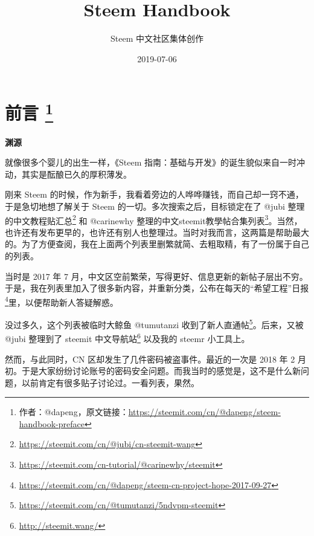 \documentclass[]{ctexbook}
\title{Steem Handbook}
\author{Steem 中文社区集体创作}
\date{2019-07-06}
\renewcommand{\href}[2]{#2\footnote{\url{#1}}}
\begin{document}

\begin{titlepage}

\end{titlepage}

\setlength{\abovedisplayskip}{-5pt}
\setlength{\abovedisplayshortskip}{-5pt}

{
\setcounter{tocdepth}{1}
\tableofcontents
}


\hypertarget{index}{%
\chapter*{\texorpdfstring{前言 \footnote{作者：@dapeng，原文链接：\url{https://steemit.com/cn/@dapeng/steem-handbook-preface}}}{前言 }}\label{index}}

\textbf{渊源}

就像很多个婴儿的出生一样，《Steem 指南：基础与开发》的诞生貌似来自一时冲动，其实是酝酿已久的厚积薄发。

刚来 Steem 的时候，作为新手，我看着旁边的人哗哗赚钱，而自己却一窍不通，于是急切地想了解关于 Steem 的一切。多次搜索之后，目标锁定在了 @jubi 整理的\href{https://steemit.com/cn/@jubi/cn-steemit-wang}{中文教程贴汇总} 和 @carinewhy 整理的\href{https://steemit.com/cn-tutorial/@carinewhy/steemit}{中文steemit教學帖合集列表}。当然，也许还有发布更早的，也许还有别人也整理过。当时对我而言，这两篇是帮助最大的。为了方便查阅，我在上面两个列表里删繁就简、去粗取精，有了一份属于自己的列表。

当时是 2017 年 7 月，中文区空前繁荣，写得更好、信息更新的新帖子层出不穷。于是，我在列表里加入了很多新内容，并重新分类，公布在每天的\href{https://steemit.com/cn/@dapeng/steem-cn-project-hope-2017-09-27}{``希望工程''日报}里，以便帮助新人答疑解惑。

没过多久，这个列表被临时大鲸鱼 @tumutanzi 收到了\href{https://steemit.com/cn/@tumutanzi/5ndvpm-steemit}{新人直通帖}。后来，又被 @jubi 整理到了 \href{http://steemit.wang/}{steemit 中文导航站} 以及我的 steemr 小工具上。

然而，与此同时，CN 区却发生了几件密码被盗事件。最近的一次是 2018 年 2 月初。于是大家纷纷讨论账号的密码安全问题。而我当时的感觉是，这不是什么新问题，以前肯定有很多贴子讨论过。一看列表，果然。
\end{document}
